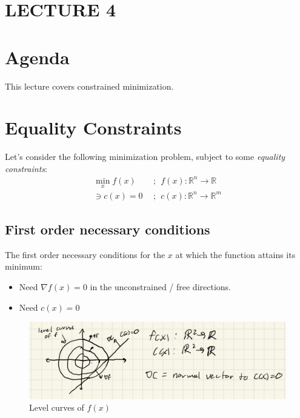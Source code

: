 \newpage
\section{LECTURE 4}

\section{Agenda}
This lecture covers constrained minimization.

\section{Equality Constraints}
Let's consider the following minimization problem, subject to some \textit{equality constraints}: 
\begin{align}
    \min_x f(x) \ \ &; \ \ f(x) : \mathbb{R}^n \longrightarrow \mathbb{R} \\
    \ni c(x) = 0 \ \ &; \ \ c(x) :  \mathbb{R}^n \longrightarrow \mathbb{R}^m
\end{align}

\subsection{First order necessary conditions}
The first order necessary conditions for the $x$ at which the function attains its minimum:
\begin{itemize}
    \item Need $\nabla f(x) = 0$ in the unconstrained / free directions. 
    \item Need $c(x)=0$
\end{itemize}

\begin{figure}
    \centering
    \includegraphics[width=0.4\linewidth]{L4_Images/EqC.PNG}
    \caption{Level curves of $f(x)$}
    \label{fig:l4f1}
\end{figure}

